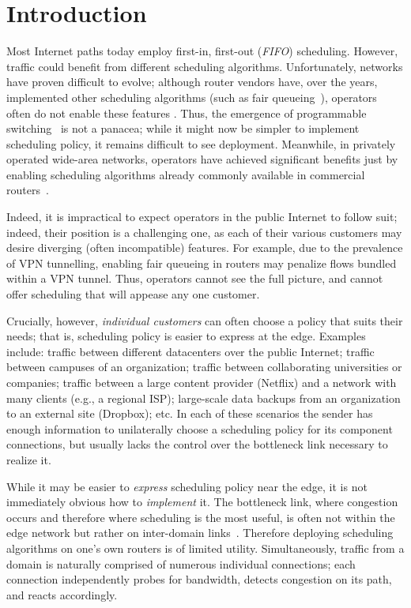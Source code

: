 \section{Introduction}\label{s:intro}

Most Internet paths today employ first-in, first-out (\emph{FIFO}) scheduling. 
However, traffic could benefit from different scheduling algorithms.
Unfortunately, networks have proven difficult to evolve; although router vendors have, over the years, implemented other scheduling algorithms (such as fair queueing~\cite{fair-queueing}), operators often do not enable these features . 
Thus, the emergence of programmable switching~\cite{p4} is not a panacea; while it might now be simpler to implement scheduling policy, it remains difficult to see deployment.
Meanwhile, in privately operated wide-area networks, operators have achieved significant benefits just by enabling scheduling algorithms already commonly available in commercial routers~\cite{b4, swan}. 

Indeed, it is impractical to expect operators in the public Internet to follow suit; indeed, their position is a challenging one, as each of their various customers may desire diverging (often incompatible) features. For example, due to the prevalence of VPN tunnelling, enabling fair queueing in routers may penalize flows bundled within a VPN tunnel.
Thus, operators cannot see the full picture, and cannot offer scheduling that will appease any one customer.

Crucially, however, \emph{individual customers} can often choose a policy that suits their needs; that is, scheduling policy is easier to express at the edge. 
Examples include: traffic between different datacenters over the public Internet; traffic between campuses of an organization; traffic between collaborating universities or companies; traffic between a large content provider (\eg Netflix) and a network with many clients (e.g., a regional ISP); large-scale data backups from an organization to an external site (\eg Dropbox); etc. 
In each of these scenarios the sender has enough information to unilaterally choose a scheduling policy for its component connections, but usually lacks the control over the bottleneck link necessary to realize it.

While it may be easier to \emph{express} scheduling policy near the edge, it is not immediately obvious how to \emph{implement} it. 
The bottleneck link, where congestion occurs and therefore where scheduling is the most useful, is often not within the edge network but rather on inter-domain links~\cite{inferring-interdomain-congestion}. 
Therefore deploying scheduling algorithms on one's own routers is of limited utility.
Simultaneously, traffic from a domain is naturally comprised of numerous individual connections;
each connection independently probes for bandwidth, detects congestion on its path, and reacts accordingly.


